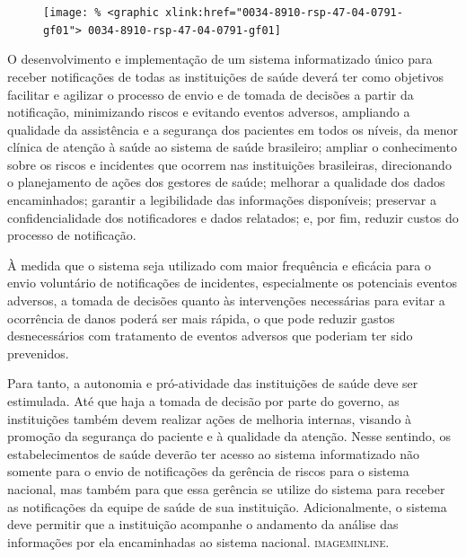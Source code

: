 \documentclass{article}
\begin{document}
\begin{figure}
\texttt{[image: \% <graphic xlink:href="0034-8910-rsp-47-04-0791-gf01">
0034-8910-rsp-47-04-0791-gf01]}
\caption{}\label{fig:f01}
\end{figure}


O desenvolvimento e implementação de um sistema informatizado único para receber
        notificações de todas as instituições de saúde deverá ter como objetivos facilitar e
        agilizar o processo de envio e de tomada de decisões a partir da notificação, minimizando
        riscos e evitando eventos adversos, ampliando a qualidade da assistência e a segurança dos
        pacientes em todos os níveis, da menor clínica de atenção à saúde ao sistema de saúde
        brasileiro; ampliar o conhecimento sobre os riscos e incidentes que ocorrem nas instituições
        brasileiras, direcionando o planejamento de ações dos gestores de saúde; melhorar a
        qualidade dos dados encaminhados; garantir a legibilidade das informações disponíveis;
        preservar a confidencialidade dos notificadores e dados relatados; e, por fim, reduzir
        custos do processo de notificação.

À medida que o sistema seja utilizado com maior frequência e eficácia para o envio
        voluntário de notificações de incidentes, especialmente os potenciais eventos adversos, a
        tomada de decisões quanto às intervenções necessárias para evitar a ocorrência de danos
        poderá ser mais rápida, o que pode reduzir gastos desnecessários com tratamento de eventos
        adversos que poderiam ter sido prevenidos.

Para tanto, a autonomia e pró-atividade das instituições de saúde deve ser estimulada. Até
        que haja a tomada de decisão por parte do governo, as instituições também devem realizar
        ações de melhoria internas, visando à promoção da segurança do paciente e à qualidade da
        atenção. Nesse sentindo, os estabelecimentos de saúde deverão ter acesso ao sistema
        informatizado não somente para o envio de notificações da gerência de riscos para o sistema
        nacional, mas também para que essa gerência se utilize do sistema para receber as
        notificações da equipe de saúde de sua instituição. Adicionalmente, o sistema deve permitir
        que a instituição acompanhe o andamento da análise das informações por ela encaminhadas ao
        sistema nacional. \textsc{imageminline}.
\end{document}
